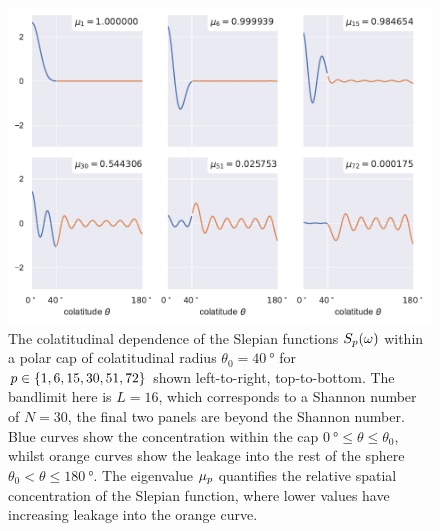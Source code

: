 \begin{figure}[htpb]
\centering\capstart{}
\includegraphics[width=\textwidth]{slepian_colatitude.pdf}
\caption[
The colatitudinal dependence of the polar cap Slepian functions
]{
The colatitudinal dependence of the Slepian functions \({S}_{p}(\omega)\) within a polar cap of colatitudinal radius \(\theta_{0}=\SI{40}{\degree}\) for \(p \in \{1, 6, 15, 30, 51, 72\}\) shown left-to-right, top-to-bottom.
The bandlimit here is  \(L=16\), which corresponds to a Shannon number of \(N=30\), \ie{} the final two panels are beyond the Shannon number.
Blue curves show the concentration within the cap \(\SI{0}{\degree} \leq \theta \leq \theta_{0}\), whilst orange curves show the leakage into the rest of the sphere \(\theta_{0} < \theta \leq \SI{180}{\degree}\).
The eigenvalue \({\mu}_{p}\) quantifies the relative spatial concentration of the Slepian function, where lower values have increasing leakage into the orange curve.
}\label{fig:chapter2_slepian_colatitude}
\end{figure}
